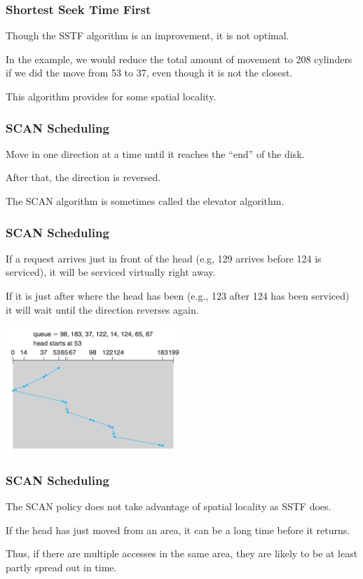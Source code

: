 \begin{frame}
\frametitle{Shortest Seek Time First}

Though the SSTF algorithm is an improvement, it is not optimal. 

In the example, we would reduce the total amount of movement to 208 cylinders if we did the move from 53 to 37, even though it is not the closest.

This algorithm provides for some spatial locality.

\end{frame}

\begin{frame}
\frametitle{SCAN Scheduling}

Move in one direction at a time until it reaches the ``end'' of the disk. 

After that, the direction is reversed. 

The SCAN algorithm is sometimes called the elevator algorithm.
\end{frame}

\begin{frame}
\frametitle{SCAN Scheduling}

If a request arrives just in front of the head (e.g, 129 arrives before 124 is serviced), it will be serviced virtually right away.

If it is just after where the head has been (e.g., 123 after 124 has been serviced) it will wait until the direction reverses again. 

\begin{center}
	\includegraphics[width=0.5\textwidth]{images/disk-scan.png}
\end{center}


\end{frame}

\begin{frame}
\frametitle{SCAN Scheduling}

The SCAN policy does not take advantage of spatial locality as SSTF does. 

If the head has just moved from an area, it can be a long time before it returns.

Thus, if there are multiple accesses in the same area, they are likely to be at least partly spread out in time.

\end{frame}

